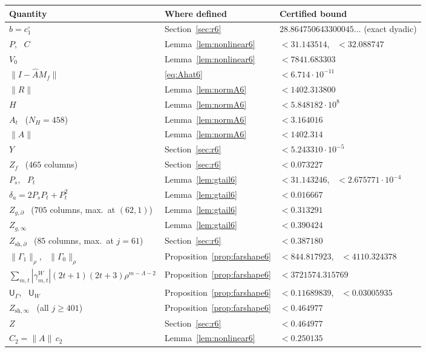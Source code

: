 \documentclass[11pt]{amsart}
\theoremstyle{definition}
\theoremstyle{remark}
\numberwithin{equation}{section}
\newcommand{\sU}{\mathsf{U}}
\newcommand{\nrm}[1]{\lVert #1\rVert}
\begin{document}
\begin{table}[ht]
\centering
\small
\begin{tabular}{@{}lll@{}}
\toprule
Quantity & Where defined & Certified bound\\
\midrule
$b=c_1^\circ$ & Section~\ref{sec:r6} & $28.864750643300045\ldots$ (exact dyadic)\\
$P$, \ $C$ & Lemma~\ref{lem:nonlinear6} & $<31.143514$, \ $<32.088747$\\
$V_0$ & Lemma~\ref{lem:nonlinear6} & $<7841.683303$\\
$\nrm{I-\widehat AM_f}$ & \eqref{eq:Ahat6} & $<6.714\cdot10^{-11}$\\
$\nrm R$ & Lemma~\ref{lem:normA6} & $<1402.313800$\\
$H$ & Lemma~\ref{lem:normA6} & $<5.848182\cdot10^{8}$\\
$A_t$ \ ($N_H=458$) & Lemma~\ref{lem:normA6} & $<3.164016$\\
$\nrm A$ & Lemma~\ref{lem:normA6} & $<1402.314$\\
\midrule
$Y$ & Section~\ref{sec:r6} & $<5.243310\cdot10^{-5}$\\
$Z_f$ \ ($465$ columns) & Section~\ref{sec:r6} & $<0.073227$\\
$P_s$, \ $P_t$ & Lemma~\ref{lem:gtail6} & $<31.143246$, \ $<2.675771\cdot10^{-4}$\\
$\delta_a=2P_sP_t+P_t^2$ & Lemma~\ref{lem:gtail6} & $<0.016667$\\
$Z_{g,\partial}$ \ ($705$ columns, max.\ at $(62,1)$) & Lemma~\ref{lem:gtail6} & $<0.313291$\\
$Z_{g,\infty}$ & Lemma~\ref{lem:gtail6} & $<0.390424$\\
$Z_{\mathrm{sh},\partial}$ \ ($85$ columns, max.\ at $j=61$) & Section~\ref{sec:r6} & $<0.387180$\\
$\nrm{\Gamma_1}_\rho$, \ $\nrm{\Gamma_0}_\rho$ & Proposition~\ref{prop:farshape6} & $<844.817923$, \ $<4110.324378$\\
$\sum_{m,t}|\gamma^W_{m,t}|(2t+1)(2t+3)\rho^{m-\Lambda-2}$ & Proposition~\ref{prop:farshape6} & $<3721574.315769$\\
$\sU_\Gamma$, \ $\sU_W$ & Proposition~\ref{prop:farshape6} & $<0.11689839$, \ $<0.03005935$\\
$Z_{\mathrm{sh},\infty}$ \ (all $j\geq401$) & Proposition~\ref{prop:farshape6} & $<0.464977$\\
$Z$ & Section~\ref{sec:r6} & $<0.464977$\\
$C_2=\nrm A\,c_2$ & Lemma~\ref{lem:nonlinear6} & $<0.250135$\\

\end{tabular}
\end{table}
\end{document}
